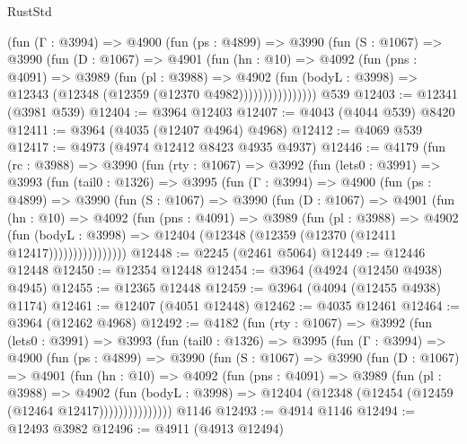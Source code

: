 \begin{lexlean}{RustStd}
\begin{coremodule}
              (fun (Γ : @3994) =>
              @4900
                (fun (ps : @4899) =>
                @3990
                  (fun (S : @1067) =>
                  @3990
                    (fun (D : @1067) =>
                    @4901
                      (fun (hn : @10) =>
                      @4092
                        (fun (pns : @4091) =>
                        @3989
                          (fun (pl : @3988) =>
                          @4902
                            (fun (bodyL : @3998) =>
                            @12343 (@12348 (@12359 (@12370 @4982))))))))))))))))
    @539
@12403 := @12341 (@3981 @539)
@12404 := @3964 @12403
@12407 := @4043 (@4044 @539) @8420
@12411 := @3964 (@4035 (@12407 @4964) @4968)
@12412 := @4069 @539
@12417 := @4973 (@4974 @12412 @8423 @4935 @4937)
@12446 := @4179
    (fun (rc : @3988) =>
    @3990
      (fun (rty : @1067) =>
      @3992
        (fun (lets0 : @3991) =>
        @3993
          (fun (tail0 : @1326) =>
          @3995
            (fun (Γ : @3994) =>
            @4900
              (fun (ps : @4899) =>
              @3990
                (fun (S : @1067) =>
                @3990
                  (fun (D : @1067) =>
                  @4901
                    (fun (hn : @10) =>
                    @4092
                      (fun (pns : @4091) =>
                      @3989
                        (fun (pl : @3988) =>
                        @4902
                          (fun (bodyL : @3998) =>
                          @12404 (@12348 (@12359 (@12370 (@12411 @12417))))))))))))))))
@12448 := @2245 (@2461 @5064)
@12449 := @12446 @12448
@12450 := @12354 @12448
@12454 := @3964 (@4924 (@12450 @4938) @4945)
@12455 := @12365 @12448
@12459 := @3964 (@4094 (@12455 @4938) @1174)
@12461 := @12407 (@4051 @12448)
@12462 := @4035 @12461
@12464 := @3964 (@12462 @4968)
@12492 := @4182
    (fun (rty : @1067) =>
    @3992
      (fun (lets0 : @3991) =>
      @3993
        (fun (tail0 : @1326) =>
        @3995
          (fun (Γ : @3994) =>
          @4900
            (fun (ps : @4899) =>
            @3990
              (fun (S : @1067) =>
              @3990
                (fun (D : @1067) =>
                @4901
                  (fun (hn : @10) =>
                  @4092
                    (fun (pns : @4091) =>
                    @3989
                      (fun (pl : @3988) =>
                      @4902
                        (fun (bodyL : @3998) =>
                        @12404 (@12348 (@12454 (@12459 (@12464 @12417)))))))))))))))
    @1146
@12493 := @4914 @1146
@12494 := @12493 @3982
@12496 := @4911 (@4913 @12494)

\end{coremodule}
\end{lexlean}
